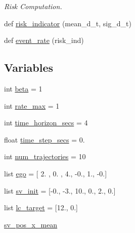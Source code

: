 \begin{DoxyCompactItemize}
\begin{DoxyCompactList}\small\item\em Risk Computation. \end{DoxyCompactList}\item 
def \hyperlink{namespaceimplementation_1_1sinadra__numpy_a71526482fa4b72a6e4e70803620d4939}{risk\+\_\+indicator} (mean\+\_\+d\+\_\+t, sig\+\_\+d\+\_\+t)
\item 
def \hyperlink{namespaceimplementation_1_1sinadra__numpy_a3ab0b363737f4bd8ac0dc34ffa32e4cb}{event\+\_\+rate} (risk\+\_\+ind)
\end{DoxyCompactItemize}
\subsection*{Variables}
\begin{DoxyCompactItemize}
\item 
int \hyperlink{namespaceimplementation_1_1sinadra__numpy_a46e710322c0614f31e91a06300914f57}{beta} = 1
\item 
int \hyperlink{namespaceimplementation_1_1sinadra__numpy_ad241c78c9390af3c90e0f0e5b329475e}{rate\+\_\+max} = 1
\item 
int \hyperlink{namespaceimplementation_1_1sinadra__numpy_a6e461e36aaa1f88a64c42356c03b0c29}{time\+\_\+horizon\+\_\+secs} = 4
\item 
float \hyperlink{namespaceimplementation_1_1sinadra__numpy_a12dc648a1f889bc02c3353e9e40c449b}{time\+\_\+step\+\_\+secs} = 0.
\item 
int \hyperlink{namespaceimplementation_1_1sinadra__numpy_a70e8ee67891d6f7a7037636211b3c425}{num\+\_\+trajectories} = 10
\item 
list \hyperlink{namespaceimplementation_1_1sinadra__numpy_a7e5d963d759b21547d6bfb6e4d59dbb1}{ego} = \mbox{[} 2. , 0. , 4., -\/0., 1., -\/0.\mbox{]}
\item 
list \hyperlink{namespaceimplementation_1_1sinadra__numpy_af46bc79a7d30743826bc7ea2614ed60e}{sv\+\_\+init} = \mbox{[}-\/0., -\/3., 10., 0., 2., 0.\mbox{]}
\item 
list \hyperlink{namespaceimplementation_1_1sinadra__numpy_aa864273e93960c9fea1b39fd0b5d9d5d}{lc\+\_\+target} = \mbox{[}12., 0.\mbox{]}
\item 
\hyperlink{namespaceimplementation_1_1sinadra__numpy_a9e4d923a830ff18359b063c459ad086e}{sv\+\_\+pos\+\_\+x\+\_\+mean}
\item 

\end{DoxyCompactItemize}
